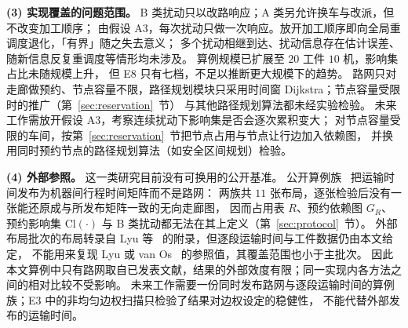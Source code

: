 \documentclass[manuscript,screen,review]{acmart}
\newcommand{\ScaleJobsHi}{20}
\newcommand{\ScaleMachHi}{10}
\begin{document}
\textbf{(3) 实现覆盖的问题范围。}
B 类扰动只以改路响应；A 类另允许换车与改派，但不改变加工顺序；
由假设 A3，每次扰动只做一次响应。放开加工顺序即向全局重调度退化，「有界」随之失去意义；
多个扰动相继到达、扰动信息存在估计误差、随新信息反复重调度等情形均未涉及。
算例规模已扩展至 \(\ScaleJobsHi\) 工件 \(\ScaleMachHi\) 机，影响集占比未随规模上升，
但 E8 只有七档，不足以推断更大规模下的趋势。
路网只对走廊做预约、节点容量不限，路径规划模块只采用时间窗 Dijkstra；节点容量受限时的推广（第~\ref{sec:reservation}~节）
与其他路径规划算法都未经实验检验。
未来工作需放开假设 A3，考察连续扰动下影响集是否会逐次累积变大；
对节点容量受限的车间，按第~\ref{sec:reservation}~节把节点占用与节点让行边加入依赖图，
并换用同时预约节点的路径规划算法（如安全区间规划）检验。

\textbf{(4) 外部参照。}
这一类研究目前没有可换用的公开基准。
公开算例族~\cite{homayouni2021production,fontes2023hybrid} 把运输时间发布为机器间行程时间矩阵而不是路网：
两族共 \(11\) 张布局，逐张检验后没有一张能还原成与所发布矩阵一致的无向走廊图，
因而占用表 \(R\)、预约依赖图 \(G_R\)、预约影响集 \(\mathrm{Cl}(\cdot)\) 与 B 类扰动都无法在其上定义（第~\ref{sec:protocol}~节）。
外部布局批次的布局转录自 Lyu 等~\cite{lyu2019approach} 的附录，但逐段运输时间与工件数据仍由本文给定，
不能用来复现 Lyu 或 van Os~\cite{vanos2026exact} 的参照值，其覆盖范围也小于主批次。
因此本文算例中只有路网取自已发表文献，结果的外部效度有限；同一实现内各方法之间的相对比较不受影响。
未来工作需要一份同时发布路网与逐段运输时间的算例族；E3 中的非均匀边权扫描只检验了结果对边权设定的稳健性，
不能代替外部发布的运输时间。



\end{document}
